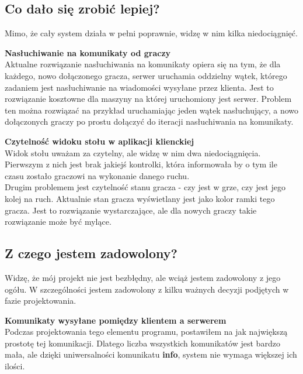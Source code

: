 \documentclass{article}
\begin{document}
    \subsection{Co dało się zrobić lepiej?}
        Mimo, że cały system działa w pełni poprawnie, widzę w nim kilka niedociągnięć.
        
        \vspace{3mm}
        \textbf{Nasłuchiwanie na komunikaty od graczy}\\
            Aktualne rozwiązanie nasłuchiwania na komunikaty opiera się na tym, że dla każdego, nowo dołączonego gracza, serwer uruchamia oddzielny wątek, którego zadaniem jest nasłuchiwanie na wiadomości wysyłane przez klienta.
            Jest to rozwiązanie kosztowne dla maszyny na której uruchomiony jest serwer.
            Problem ten można rozwiązać na przykład uruchamiając jeden wątek nasłuchujący, a nowo dołączonych graczy po prostu dołączyć do iteracji nasłuchiwania na komunikaty.
            
        \vspace{3mm}
        \textbf{Czytelność widoku stołu w aplikacji klienckiej}\\
            Widok stołu uważam za czytelny, ale widzę w nim dwa niedociągnięcia.
            Pierwszym z nich jest brak jakiejś kontrolki, która informowała by o tym ile czasu zostało graczowi na wykonanie danego ruchu.
            \\
            Drugim problemem jest czytelność stanu gracza - czy jest w grze, czy jest jego kolej na ruch.
            Aktualnie stan gracza wyświetlany jest jako kolor ramki tego gracza. Jest to rozwiązanie wystarczające, ale dla nowych graczy takie rozwiązanie może być mylące.
        
    
    \subsection{Z czego jestem zadowolony?}
        Widzę, że mój projekt nie jest bezbłędny, ale wciąż jestem zadowolony z jego ogółu.
        W szczególności jestem zadowolony z kilku ważnych decyzji podjętych w fazie projektowania.
        
        \vspace{3mm}
        \textbf{Komunikaty wysyłane pomiędzy klientem a serwerem}\\
            Podczas projektowania tego elementu programu, postawiłem na jak największą prostotę tej komunikacji.
            Dlatego liczba wszystkich komunikatów jest bardzo mała, ale dzięki uniwersalności komunikatu \textbf{info}, system nie wymaga większej ich ilości.
        
\end{document}
